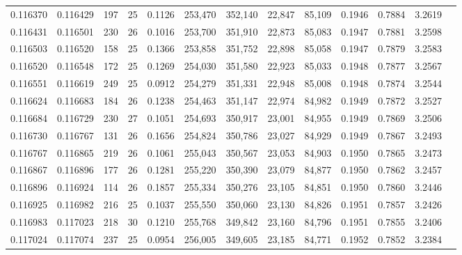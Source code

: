 \begin{tabular}{rrrrrrrrrrrrr}
0.116370 & 0.116429 & 197 &  25 &                                     0.1126 & 253,470 & 352,140 &  22,847 &  85,109 & 0.1946 & 0.7884 & 3.2619 \\
0.116431 & 0.116501 & 230 &  26 &                                     0.1016 & 253,700 & 351,910 &  22,873 &  85,083 & 0.1947 & 0.7881 & 3.2598 \\
0.116503 & 0.116520 & 158 &  25 &                                     0.1366 & 253,858 & 351,752 &  22,898 &  85,058 & 0.1947 & 0.7879 & 3.2583 \\
0.116520 & 0.116548 & 172 &  25 &                                     0.1269 & 254,030 & 351,580 &  22,923 &  85,033 & 0.1948 & 0.7877 & 3.2567 \\
0.116551 & 0.116619 & 249 &  25 &                                     0.0912 & 254,279 & 351,331 &  22,948 &  85,008 & 0.1948 & 0.7874 & 3.2544 \\
0.116624 & 0.116683 & 184 &  26 &                                     0.1238 & 254,463 & 351,147 &  22,974 &  84,982 & 0.1949 & 0.7872 & 3.2527 \\
0.116684 & 0.116729 & 230 &  27 &                                     0.1051 & 254,693 & 350,917 &  23,001 &  84,955 & 0.1949 & 0.7869 & 3.2506 \\
0.116730 & 0.116767 & 131 &  26 &                                     0.1656 & 254,824 & 350,786 &  23,027 &  84,929 & 0.1949 & 0.7867 & 3.2493 \\
0.116767 & 0.116865 & 219 &  26 &                                     0.1061 & 255,043 & 350,567 &  23,053 &  84,903 & 0.1950 & 0.7865 & 3.2473 \\
0.116867 & 0.116896 & 177 &  26 &                                     0.1281 & 255,220 & 350,390 &  23,079 &  84,877 & 0.1950 & 0.7862 & 3.2457 \\
0.116896 & 0.116924 & 114 &  26 &                                     0.1857 & 255,334 & 350,276 &  23,105 &  84,851 & 0.1950 & 0.7860 & 3.2446 \\
0.116925 & 0.116982 & 216 &  25 &                                     0.1037 & 255,550 & 350,060 &  23,130 &  84,826 & 0.1951 & 0.7857 & 3.2426 \\
0.116983 & 0.117023 & 218 &  30 &                                     0.1210 & 255,768 & 349,842 &  23,160 &  84,796 & 0.1951 & 0.7855 & 3.2406 \\
0.117024 & 0.117074 & 237 &  25 &                                     0.0954 & 256,005 & 349,605 &  23,185 &  84,771 & 0.1952 & 0.7852 & 3.2384 \\

\end{tabular}
